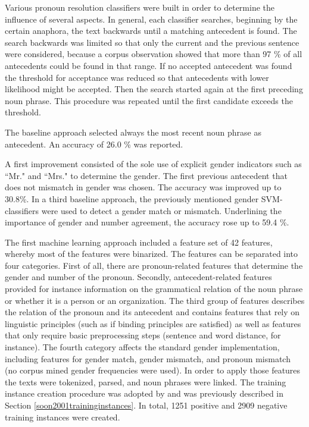 Various pronoun resolution classifiers were built in order to determine the influence of several aspects. In general, each classifier searches, beginning by the certain anaphora, the text backwards until a matching antecedent is found. The search backwards was limited so that only the current and the previous sentence were considered, because a corpus observation showed that more than 97 \% of all antecedents could be found in that range. If no accepted antecedent was found the threshold for acceptance was reduced so that antecedents with lower likelihood might be accepted. Then the search started again at the first preceding noun phrase. This procedure was repeated until the first candidate exceeds the threshold. 

The baseline approach selected always the most recent noun phrase as antecedent. An accuracy of 26.0 \% was reported. 

A first improvement consisted of the sole use of explicit gender indicators such as ``Mr." and ``Mrs." to determine the gender. The first previous antecedent that does not mismatch in gender was chosen. The accuracy was improved up to 30.8\%. 
In a third baseline approach, the previously mentioned gender SVM-classifiers were used to detect a gender match or mismatch. Underlining the importance of gender and number agreement, the accuracy rose up to 59.4 \%.

The first machine learning approach included a feature set of 42 features, whereby most of the features were binarized. The features can be separated into four categories. First of all, there are pronoun-related features that determine the gender and number of the pronoun. Secondly, antecedent-related features provided for instance information on the grammatical relation of the noun phrase or whether it is a person or an organization. The third group of features describes the relation of the pronoun and its antecedent and contains features that rely on linguistic principles (such as if binding principles are satisfied) as well as features that only require basic preprocessing steps (sentence and word distance, for instance). The fourth category affects the standard gender implementation, including features for gender match, gender mismatch, and pronoun mismatch (no corpus mined gender frequencies were used). In order to apply those features the texts were tokenized, parsed, and noun phrases were linked. The training instance creation procedure was adopted by \cite{soon2001machine} and was previously described in Section \ref{soon2001traininginstances}. In total, 1251 positive and 2909 negative training instances were created. 


